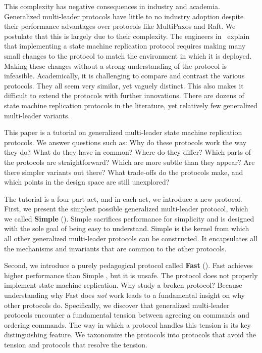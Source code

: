 This complexity has negative consequences in industry and academia. Generalized
multi-leader protocols have little to no industry adoption despite their
performance advantages over protocols like MultiPaxos and Raft. We postulate
that this is largely due to their complexity. The engineers
in~\cite{chandra2007paxos} explain that implementing a state machine replication
protocol requires making many small changes to the protocol to match the
environment in which it is deployed. Making these changes without a strong
understanding of the protocol is infeasible. Academically, it is challenging to
compare and contrast the various protocols. They all seem very similar, yet
vaguely distinct. This also makes it difficult to extend the protocols with
further innovations. There are dozens of state machine replication protocols in
the literature, yet relatively few generalized multi-leader variants.

This paper is a tutorial on generalized multi-leader state machine replication
protocols. We answer questions such as: Why do these protocols work the way
they do? What do they have in common? Where do they differ? Which parts of
the protocols are straightforward? Which are more subtle than they appear? Are
there simpler variants out there? What trade-offs do the protocols make, and
which points in the design space are still unexplored?

The tutorial is a four part act, and in each act, we introduce a new protocol.
First, we present the simplest possible generalized multi-leader protocol, which
we called \textbf{Simple \BPaxos{}} (). Simple \BPaxos{}
sacrifices performance for simplicity and is designed with the sole goal of
being easy to understand.  Simple \BPaxos{} is the kernel from which all other
generalized multi-leader protocols can be constructed. It encapsulates all the
mechanisms and invariants that are common to the other protocols.

Second, we introduce a purely pedagogical protocol called \textbf{Fast
\BPaxos{}} (). Fast \BPaxos{} achieves higher performance
than Simple \BPaxos{}, but it is unsafe. The protocol does not properly
implement state machine replication. Why study a broken protocol? Because
understanding why Fast \BPaxos{} does \emph{not} work leads to a fundamental
insight on why other protocols do. Specifically, we discover that generalized
multi-leader protocols encounter a fundamental tension between agreeing on
commands and ordering commands. The way in which a protocol handles this
tension is its key distinguishing feature. We taxonomize the protocols into
protocols that avoid the tension and protocols that resolve the tension.


